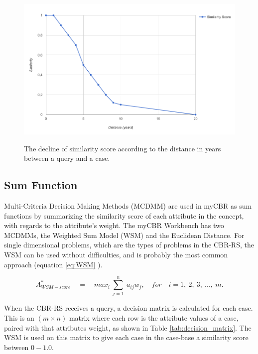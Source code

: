 \begin{figure}[h]
    \centering
    \caption{The decline of similarity score according to the distance in years between a query and a case.}
    \includegraphics[width=1.0\textwidth]{fig/study_period_graph.png}
    \label{fig:study_period_graph}
\end{figure}

\subsection{Sum Function}

Multi-Criteria Decision Making Methods (MCDMM) are used in myCBR as sum functions by summarizing the similarity score of each attribute in the concept, with regards to the attribute's weight. The myCBR Workbench has two MCDMMs, the Weighted Sum Model (WSM) and the Euclidean Distance. For single dimensional problems, which are the types of problems in the CBR-RS, the WSM can be used without difficulties, and is probably the most common approach \cite{triantaphyllou2000multi} (equation \ref{eq:WSM} \cite{fishburn1967letter}).

\begin{equation} \label{eq:WSM}
    A^{*}_{WSM-score}\quad =\quad max_{i}\  \sum\limits_{j = 1}^{n}\  a_{ij}w_{j},\quad for \quad i =1,\ 2,\ 3,\ ...,\ m.
\end{equation}

When the CBR-RS receives a query, a decision matrix is calculated for each case. This is an $(m \times n)$ matrix where each row is the attribute values of a case, paired with that attributes weight, as shown in Table \ref{tab:decision_matrix}. The WSM is used on this matrix to give each case in the case-base a similarity score between $0-1.0$.


